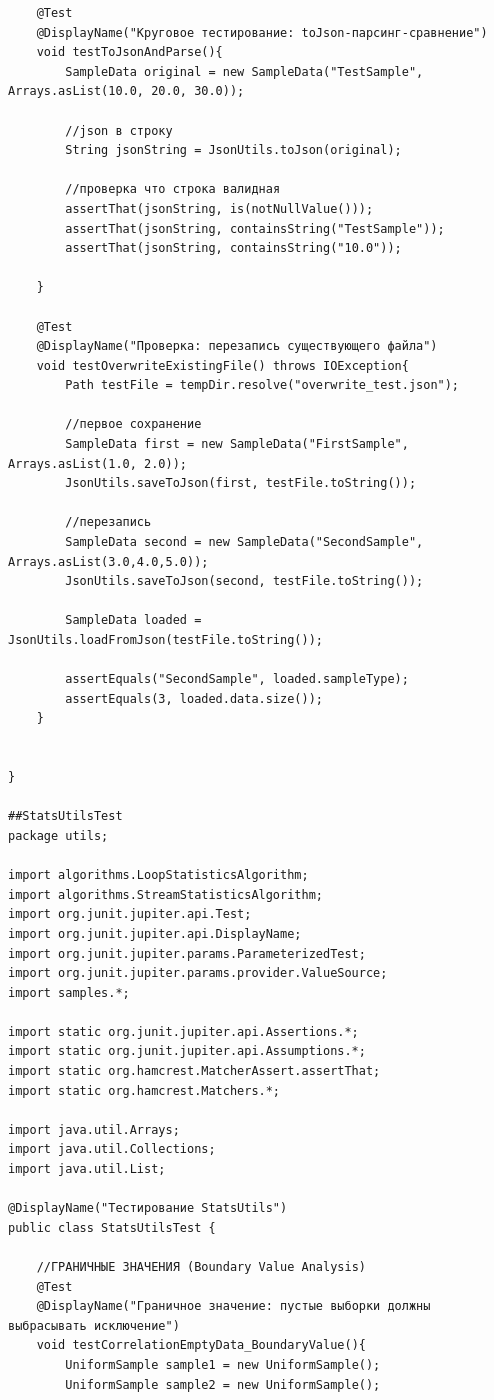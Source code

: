 \begin{verbatim}
    @Test
    @DisplayName("Круговое тестирование: toJson-парсинг-сравнение")
    void testToJsonAndParse(){
        SampleData original = new SampleData("TestSample", Arrays.asList(10.0, 20.0, 30.0));

        //json в строку
        String jsonString = JsonUtils.toJson(original);

        //проверка что строка валидная
        assertThat(jsonString, is(notNullValue()));
        assertThat(jsonString, containsString("TestSample"));
        assertThat(jsonString, containsString("10.0"));

    }

    @Test
    @DisplayName("Проверка: перезапись существующего файла")
    void testOverwriteExistingFile() throws IOException{
        Path testFile = tempDir.resolve("overwrite_test.json");

        //первое сохранение
        SampleData first = new SampleData("FirstSample", Arrays.asList(1.0, 2.0));
        JsonUtils.saveToJson(first, testFile.toString());

        //перезапись
        SampleData second = new SampleData("SecondSample", Arrays.asList(3.0,4.0,5.0));
        JsonUtils.saveToJson(second, testFile.toString());

        SampleData loaded = JsonUtils.loadFromJson(testFile.toString());

        assertEquals("SecondSample", loaded.sampleType);
        assertEquals(3, loaded.data.size());
    }


}

##StatsUtilsTest
package utils;

import algorithms.LoopStatisticsAlgorithm;
import algorithms.StreamStatisticsAlgorithm;
import org.junit.jupiter.api.Test;
import org.junit.jupiter.api.DisplayName;
import org.junit.jupiter.params.ParameterizedTest;
import org.junit.jupiter.params.provider.ValueSource;
import samples.*;

import static org.junit.jupiter.api.Assertions.*;
import static org.junit.jupiter.api.Assumptions.*;
import static org.hamcrest.MatcherAssert.assertThat;
import static org.hamcrest.Matchers.*;

import java.util.Arrays;
import java.util.Collections;
import java.util.List;

@DisplayName("Тестирование StatsUtils")
public class StatsUtilsTest {

    //ГРАНИЧНЫЕ ЗНАЧЕНИЯ (Boundary Value Analysis)
    @Test
    @DisplayName("Граничное значение: пустые выборки должны выбрасывать исключение")
    void testCorrelationEmptyData_BoundaryValue(){
        UniformSample sample1 = new UniformSample();
        UniformSample sample2 = new UniformSample();


\end{verbatim}
